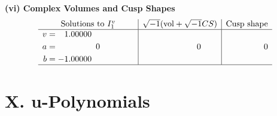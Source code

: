 \documentclass[1p]{elsarticle_modified}
\theoremstyle{definition}
\newcommand{\I}{\sqrt{-1}}
\begin{document}
\newpage\flushleft \textbf{(vi) Complex Volumes and Cusp Shapes}
$$\begin{array}{c|c|c}  
\text{Solutions to }I^v_{1}& \I (\text{vol} + \sqrt{-1}CS) & \text{Cusp shape}\\
 \hline 
\begin{aligned}
v &= \phantom{-}1.00000\phantom{ +0.000000I} \\
a &= \phantom{-0.000000 } 0 \\
b &= -1.00000\phantom{ +0.000000I}\end{aligned}
 & \phantom{-0.000000 } 0 & \phantom{-0.000000 } 0\\
 \hline 
 \end{array}$$\newpage
\newpage\renewcommand{\arraystretch}{1}
\centering \section*{ X. u-Polynomials}
\end{document}
